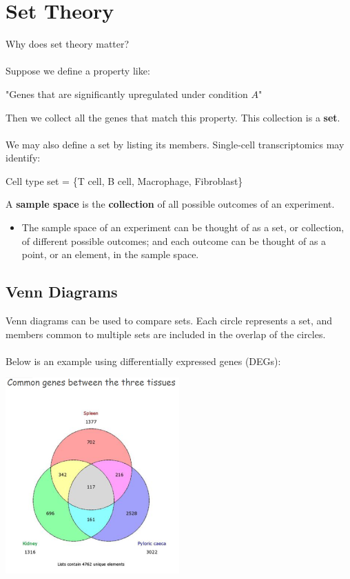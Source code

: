 \documentclass[10pt]{article}
\begin{document}
\section*{Set Theory}
Why does set theory matter?\\\\
Suppose we define a property like:
\begin{center}
    "Genes that are significantly upregulated under condition $A$"
\end{center}
Then we collect all the genes that match this property.  This collection is a \textbf{set}.\\\\
We may also define a set by listing its members.  Single-cell transcriptomics may identify:
\begin{center}
    Cell type set = \{T cell, B cell, Macrophage, Fibroblast\}
\end{center}
A \textbf{sample space} is the \textbf{collection} of all possible outcomes of an experiment.
\begin{itemize}
	\item The sample space of an experiment can be thought of as a set, or collection, of different possible outcomes; and each outcome can be thought of as a point, or an element, in the sample space.
\end{itemize}

\subsection*{Venn Diagrams}
Venn diagrams can be used to compare sets.  Each circle represents a set, and members common to multiple sets are included in the overlap of the circles.\\\\
Below is an example using differentially expressed genes (DEGs):
\begin{center} 
	\includegraphics*[width=0.5\textwidth]{M2_1.png} 
\end{center}
\end{document}
